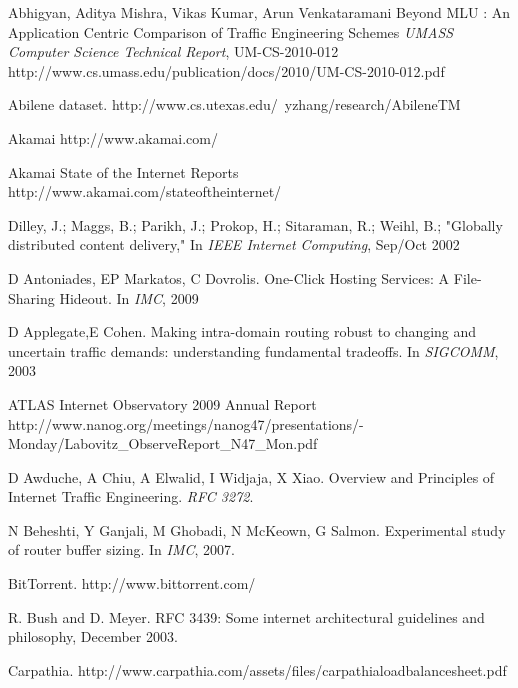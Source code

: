 
\begin{thebibliography}{99}%


	Abhigyan, Aditya Mishra, Vikas Kumar, Arun Venkataramani
	Beyond MLU : An Application Centric Comparison of Traffic Engineering Schemes
	\emph{UMASS Computer Science Technical Report}, UM-CS-2010-012
	http://www.cs.umass.edu/publication/docs/2010/UM-CS-2010-012.pdf

	Abilene dataset.
	http://www.cs.utexas.edu/~yzhang/research/AbileneTM

	Akamai http://www.akamai.com/

	Akamai State of the Internet Reports
	http://www.akamai.com/stateoftheinternet/
	
	Dilley, J.; Maggs, B.; Parikh, J.; Prokop, H.; Sitaraman, R.; Weihl, B.;
	"Globally distributed content delivery," 
	In \emph{IEEE Internet Computing}, Sep/Oct 2002




	D  Antoniades, EP Markatos, C Dovrolis.
	One-Click Hosting Services: A File-Sharing Hideout.
	In \emph{IMC}, 2009

	D Applegate,E Cohen.
	Making intra-domain routing robust to changing and uncertain traffic demands: understanding fundamental tradeoffs.
	In \emph{SIGCOMM},
	 2003

	ATLAS Internet Observatory 2009 Annual Report
	http://www.nanog.org/meetings/nanog47/presentations/-Monday/Labovitz\_ObserveReport\_N47\_Mon.pdf




	D Awduche, A Chiu, A Elwalid, I Widjaja, X Xiao.
	Overview and Principles of Internet Traffic Engineering.
	\emph{RFC 3272}.

	N Beheshti, Y Ganjali, M Ghobadi, N McKeown, G Salmon.
	Experimental study of router buffer sizing.
	In \emph{IMC},	2007.

	BitTorrent.
	http://www.bittorrent.com/

	R. Bush and D. Meyer. RFC 3439: Some internet architectural guidelines and philosophy, December 2003.

	Carpathia. http://www.carpathia.com/assets/files/carpathialoadbalancesheet.pdf


\end{thebibliography}
